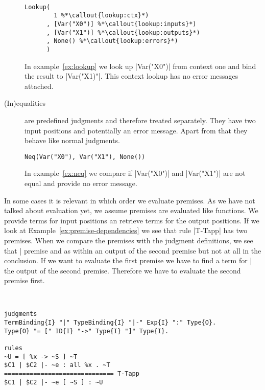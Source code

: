 \begin{description}
\begin{example}{~}
\begin{lstlisting}[language=sltc]
Lookup(
        1 %*\callout{lookup:ctx}*)
      , [Var("X0")] %*\callout{lookup:inputs}*)
      , [Var("X1")] %*\callout{lookup:outputs}*)
      , None() %*\callout{lookup:errors}*)
      )
\end{lstlisting}
\label{ex:lookup}
\end{example}

  In example~\ref{ex:lookup} we look up \code|Var("X0")| from
  context one and bind the result to \code|Var("X1)"|. This context
  lookup has no error messages attached.

\item[(In)equalities] are predefined judgments and therefore treated
  separately. They have two input positions and potentially an error
  message. Apart from that they behave like normal judgments.

\begin{example}
\begin{lstlisting}[language=sltc]
Neq(Var("X0"), Var("X1"), None())
\end{lstlisting}
\label{ex:neq}
\end{example}

  In example~\ref{ex:neq} we compare if \code|Var("X0")| and
  \code|Var("X1")| are not equal and provide no error message.
\end{description}

In some cases it is relevant in which order we evaluate premises. As
we have not talked about evaluation yet, we assume premises are
evaluated like functions. We provide terms for input positions an
retrieve terms for the output positions. If we look at
Example~\ref{ex:premise-dependencies} we see that rule \code|T-Tapp|
has two premises. When we compare the premises with the judgment
definitions, we see that \code|%
premise and as within an output of the second premise but not at all
in the conclusion. If we want to evaluate the first premise we have to
find a term for \code|%
the output of the second premise. Therefore we have to evaluate the
second premise first.

\begin{example}{~}
\begin{lstlisting}[language=sltc]
judgments
TermBinding{I} "|" TypeBinding{I} "|-" Exp{I} ":" Type{O}.
Type{O} "= [" ID{I} "->" Type{I} "]" Type{I}.

rules
~U = [ %x -> ~S ] ~T
$C1 | $C2 |- ~e : all %x . ~T 
============================== T-Tapp
$C1 | $C2 |- ~e [ ~S ] : ~U
\end{lstlisting}
\label{ex:premise-dependencies}
\end{example}

